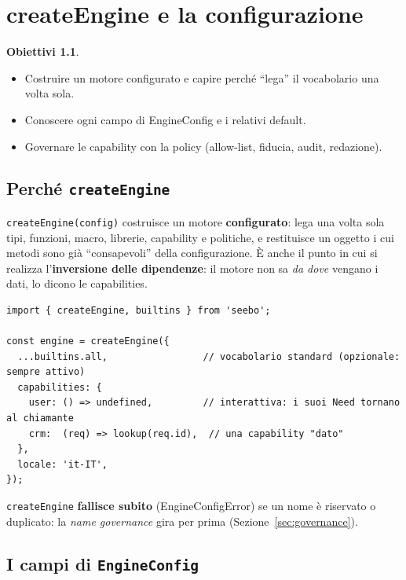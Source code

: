 \documentclass[11pt,a4paper]{book}
\let\code\lstinline
\newcommand{\ic}[1]{{\ttfamily #1}}
\theoremstyle{definition}
\newtheorem*{obiettivi}{Obiettivi}
\begin{document}
{{{{\chapter{createEngine e la configurazione}
\label{ch:config}

\begin{obiettivi}
\begin{itemize}
  \item Costruire un motore configurato e capire perché ``lega'' il vocabolario
    una volta sola.
  \item Conoscere ogni campo di \ic{EngineConfig} e i relativi default.
  \item Governare le capability con la \ic{policy} (allow-list, fiducia, audit,
    redazione).
\end{itemize}
\end{obiettivi}

\section{Perché \texttt{createEngine}}

\code|createEngine(config)| costruisce un motore \textbf{configurato}: lega una
volta sola tipi, funzioni, macro, librerie, capability e politiche, e restituisce
un oggetto i cui metodi sono già ``consapevoli'' della configurazione. È anche il
punto in cui si realizza l'\textbf{inversione delle dipendenze}: il motore non sa
\emph{da dove} vengano i dati, lo dicono le \ic{capabilities}.

\begin{lstlisting}
import { createEngine, builtins } from 'seebo';

const engine = createEngine({
  ...builtins.all,                 // vocabolario standard (opzionale: sempre attivo)
  capabilities: {
    user: () => undefined,         // interattiva: i suoi Need tornano al chiamante
    crm:  (req) => lookup(req.id),  // una capability "dato"
  },
  locale: 'it-IT',
});
\end{lstlisting}

\code|createEngine| \textbf{fallisce subito} (\ic{EngineConfigError}) se un nome è
riservato o duplicato: la \emph{name governance} gira per prima
(Sezione~\ref{sec:governance}).

\section{I campi di \texttt{EngineConfig}}

}}}}
\end{document}

